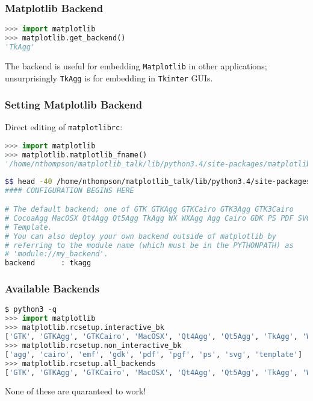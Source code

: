 \documentclass{beamer}
\begin{document}
\begin{frame}[fragile]
\frametitle{Matplotlib Backend}
\begin{lstlisting}[language=Python]
>>> import matplotlib
>>> matplotlib.get_backend()
'TkAgg'
\end{lstlisting}
The backend is useful for embedding \texttt{Matplotlib} in other applications; unsurprisingly \texttt{TkAgg} is for embedding in \texttt{Tkinter} GUIs.

\end{frame}

\begin{frame}[fragile]
\frametitle{Setting Matplotlib Backend}
Direct editing of \texttt{matplotlibrc}:
\begin{lstlisting}[language=Python]
>>> import matplotlib
>>> matplotlib.matplotlib_fname()
'/home/nthompson/matplotlib_talk/lib/python3.4/site-packages/matplotlib/mpl-data/matplotlibrc'
\end{lstlisting}
\begin{lstlisting}[language=bash]
$$ head -40 /home/nthompson/matplotlib_talk/lib/python3.4/site-packages/matplotlib/mpl-data/matplotlibrc
#### CONFIGURATION BEGINS HERE

# The default backend; one of GTK GTKAgg GTKCairo GTK3Agg GTK3Cairo
# CocoaAgg MacOSX Qt4Agg Qt5Agg TkAgg WX WXAgg Agg Cairo GDK PS PDF SVG
# Template.
# You can also deploy your own backend outside of matplotlib by
# referring to the module name (which must be in the PYTHONPATH) as
# 'module://my_backend'.
backend      : tkagg
\end{lstlisting}
\end{frame}

\begin{frame}[fragile]
\frametitle{Available Backends}
\begin{lstlisting}[language=Python]
$ python3 -q
>>> import matplotlib
>>> matplotlib.rcsetup.interactive_bk
['GTK', 'GTKAgg', 'GTKCairo', 'MacOSX', 'Qt4Agg', 'Qt5Agg', 'TkAgg', 'WX', 'WXAgg', 'CocoaAgg', 'GTK3Cairo', 'GTK3Agg', 'WebAgg', 'nbAgg']
>>> matplotlib.rcsetup.non_interactive_bk
['agg', 'cairo', 'emf', 'gdk', 'pdf', 'pgf', 'ps', 'svg', 'template']
>>> matplotlib.rcsetup.all_backends
['GTK', 'GTKAgg', 'GTKCairo', 'MacOSX', 'Qt4Agg', 'Qt5Agg', 'TkAgg', 'WX', 'WXAgg', 'CocoaAgg', 'GTK3Cairo', 'GTK3Agg', 'WebAgg', 'nbAgg', 'agg', 'cairo', 'emf', 'gdk', 'pdf', 'pgf', 'ps', 'svg', 'template']
\end{lstlisting}
None of these are quaranteed to work!

\end{frame}
\end{document}
